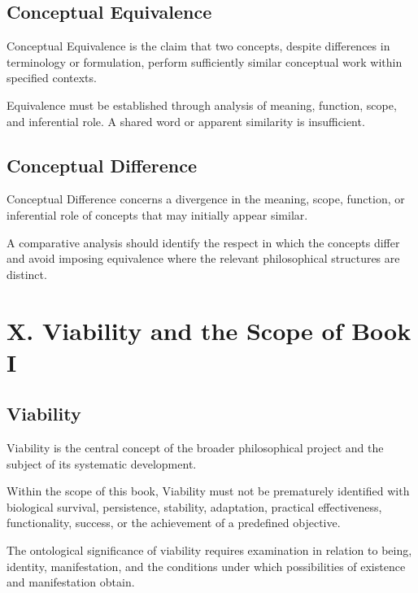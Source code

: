 \subsection*{Conceptual Equivalence}

Conceptual Equivalence is the claim that two concepts, despite
differences in terminology or formulation, perform sufficiently
similar conceptual work within specified contexts.

Equivalence must be established through analysis of meaning,
function, scope, and inferential role. A shared word or apparent
similarity is insufficient.


\subsection*{Conceptual Difference}

Conceptual Difference concerns a divergence in the meaning, scope,
function, or inferential role of concepts that may initially appear
similar.

A comparative analysis should identify the respect in which the
concepts differ and avoid imposing equivalence where the relevant
philosophical structures are distinct.



\section*{X. Viability and the Scope of Book I}


\subsection*{Viability}

Viability is the central concept of the broader philosophical project
and the subject of its systematic development.

Within the scope of this book, Viability must not be prematurely
identified with biological survival, persistence, stability,
adaptation, practical effectiveness, functionality, success, or
the achievement of a predefined objective.

The ontological significance of viability requires examination
in relation to being, identity, manifestation, and the conditions
under which possibilities of existence and manifestation obtain.

